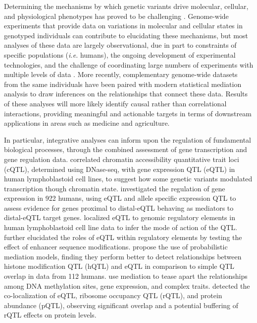 Determining the mechanisms by which genetic variants drive molecular, cellular, and physiological phenotypes has proved to be challenging \citep{Schadt2009}. Genome-wide experiments that provide data on variations in molecular and cellular states in genotyped individuals can contribute to elucidating these mechanisms, but most analyses of these data are largely observational, due in part to constraints of specific populations (\textit{i.e.} humans), the ongoing development of experimental technologies, and the challenge of coordinating large numbers of experiments with multiple levels of data \citep{Schaid2018}. More recently, complementary genome-wide datasets from the same individuals have been paired with modern statistical mediation analysis to draw inferences on the relationships that connect these data. Results of these analyses will more likely identify causal rather than correlational interactions, providing meaningful and actionable targets in terms of downstream applications in areas such as medicine and agriculture.

In particular, integrative analyses can inform upon the regulation of fundamental biological processes, through the combined assessment of gene transcription and gene regulation data. \cite{Degner2012} correlated chromatin accessibility quantitative trait loci (cQTL), determined using DNase-seq, with gene expression QTL (eQTL) in human lymphoblastoid cell lines, to suggest how some genetic variants modulated transcription though chromatin state. \cite{Battle2014} investigated the regulation of gene expression in 922 humans, using eQTL and allele specific expression QTL to assess evidence for genes proximal to distal-eQTL behaving as mediators to distal-eQTL target genes. \cite{Pai2015} localized eQTL to genomic regulatory elements in human lymphoblastoid cell line data to infer the mode of action of the QTL. \cite{Alasoo2017} further elucidated the roles of eQTL within regulatory elements by testing the effect of enhancer sequence modifications. \cite{Roytman2018} propose the use of probabilistic mediation models, finding they perform better to detect relationships between histone modification QTL (hQTL) and eQTL in comparison to simple QTL overlap in data from 112 humans. \cite{Wu2018} use mediation to tease apart the relationships among DNA methylation sites, gene expression, and complex traits. \cite{Battle2015} detected the co-localization of eQTL, ribosome occupancy QTL (rQTL), and protein abundance (pQTL), observing significant overlap and a potential buffering of rQTL effects on protein levels.

